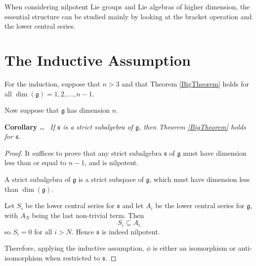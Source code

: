 \documentclass[honours]{UNSWthesis}
\newcommand{\g}{\mathfrak{g}}
\newcommand{\1}{\mathbf{e}_{1}}
\newcommand{\2}{\mathbf{e}_{3}}
\newcommand{\3}{\mathbf{e}_{3}}
\newcounter{Item}[section]
\newenvironment{Corollary}{\medskip
                            \refstepcounter{Item}
                            \noindent
                           {\bf Corollary \thesection.\theItem.}\ %
                            \begingroup \sl}
                           {\endgroup\medskip}
\begin{document}




When considering nilpotent Lie groups and Lie algebras of higher dimension, the essential structure can be studied mainly by looking at the bracket operation and the lower central series.




\section{The Inductive Assumption}
For the induction, suppose that $n > 3$ and that Theorem \ref{BigTheorem} holds for all $\dim(\g)=1,2,\ldots, n-1$. 

Now suppose that $\g$ has dimension $n$. 

\begin{Corollary}\label{CorReduceDim}
If $\mathfrak{s}$ is a strict subalgebra of $\g$, then Theorem \ref{BigTheorem} holds for $\mathfrak{s}$. 
\end{Corollary}

\begin{proof}
It suffices to prove that any strict subalgebra $\mathfrak{s}$ of $\g$ must have dimension less than or equal to $n-1$, and is nilpotent. 

A strict subalgebra of $\g$ is a strict subspace of $\g$, which must have dimension less than $\dim(\g)$. 

Let $S_i$ be the lower central series for $\mathfrak{s}$ and let  $A_i$ be the lower central series for $\g$, with $A_N$ being the last non-trivial term. Then 
\[
S_i \subseteq A_i
\] 
so $S_i =0$ for all $i > N$. Hence $\mathfrak{s}$ is indeed nilpotent. 



Therefore, applying the inductive assumption, $\phi$ is either an isomorphism or anti-isomorphism when restricted to $\mathfrak{s}$.
  
\end{proof}
\end{document}
